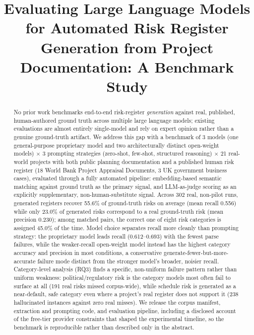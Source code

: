 \documentclass[conference]{IEEEtran}
\begin{document}
\title{Evaluating Large Language Models for Automated Risk Register Generation from Project Documentation: A Benchmark Study}

\author{
\and
{}
}

\maketitle

\begin{abstract}
No prior work benchmarks end-to-end risk-register \emph{generation} against
real, published, human-authored ground truth across multiple large language
models; existing evaluations are almost entirely single-model and rely on
expert opinion rather than a genuine ground-truth artifact. We address this
gap with a benchmark of 3 models (one general-purpose proprietary model and
two architecturally distinct open-weight models) $\times$ 3 prompting
strategies (zero-shot, few-shot, structured reasoning) $\times$ 21
real-world projects with both public planning documentation and a published
human risk register (18 World Bank Project Appraisal Documents, 3 UK
government business cases), evaluated through a fully automated pipeline:
embedding-based semantic matching against ground truth as the primary
signal, and LLM-as-judge scoring as an explicitly supplementary,
non-human-substitute signal. Across 302 real,
non-pilot runs, generated registers recover 55.6\% of ground-truth risks on
average (mean recall 0.556) while only 23.0\% of generated risks correspond
to a real ground-truth risk (mean precision 0.230); among matched pairs, the
correct one of eight risk categories is assigned 45.0\% of the time. Model
choice separates recall more cleanly than prompting strategy: the
proprietary model leads recall (0.612--0.693) with the fewest parse
failures, while the weaker-recall open-weight model instead has the highest
category accuracy and precision in most conditions, a conservative
generate-fewer-but-more-accurate failure mode distinct from the
stronger model's broader, noisier recall. Category-level analysis (RQ3)
finds a specific, non-uniform failure pattern rather than uniform weakness:
political/regulatory risk is the category models most often fail to
surface at all (191 real risks missed corpus-wide), while schedule risk is
generated as a near-default, safe category even where a project's real
register does not support it (238 hallucinated instances against zero real
misses). We release the corpus manifest, extraction and prompting code, and
evaluation pipeline, including a disclosed account of the free-tier
provider constraints that shaped the experimental timeline, so the
benchmark is reproducible rather than described only in the abstract.
\end{abstract}
\end{document}
